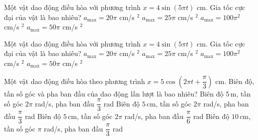 \begin{ex}
Một vật dao động điều hòa với phương trình $x = 4\sin(5\pi t)$ cm. Gia tốc cực đại của vật là bao nhiêu?
\choice
{$a_{\max} = 20\pi$ cm/s $^2$}
{$a_{\max} = 25\pi$ cm/s $^2$}
{\True $a_{\max} = 100\pi^2$ cm/s $^2$}
{$a_{\max} = 50\pi$ cm/s $^2$}
\end{ex}

\begin{ex}
Một vật dao động điều hòa với phương trình $x = 4\sin(5\pi t)$ cm. Gia tốc cực đại của vật là bao nhiêu?
\choice
{$a_{\max} = 20\pi$ cm/s $^2$}
{$a_{\max} = 25\pi$ cm/s $^2$}
{\True $a_{\max} = 100\pi^2$ cm/s $^2$}
{$a_{\max} = 50\pi$ cm/s $^2$}
\end{ex}

\begin{ex}
Một vật dao động điều hòa theo phương trình $x=5\cos\left(2\pi t+\dfrac{\pi}{3}\right)$ cm. Biên độ, tần số góc và pha ban đầu của dao động lần lượt là bao nhiêu?
\choice
{Biên độ $5\,\text{m}$, tần số góc $2\pi$ rad/s, pha ban đầu $\dfrac{\pi}{3}$ rad}
{\True Biên độ $5\,\text{cm}$, tần số góc $2\pi$ rad/s, pha ban đầu $\dfrac{\pi}{3}$ rad}
{Biên độ $5\,\text{cm}$, tần số góc $2\pi$ rad/s, pha ban đầu $\dfrac{\pi}{6}$ rad}
{Biên độ $10\,\text{cm}$, tần số góc $\pi$ rad/s, pha ban đầu $\dfrac{\pi}{3}$ rad}
\end{ex}

